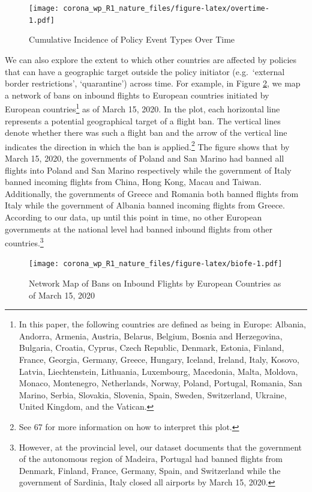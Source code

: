 \documentclass[]{article}
\let\rmarkdownfootnote\footnote%
\def\footnote{\protect\rmarkdownfootnote}
\begin{document}
\begin{figure}
\centering
\texttt{[image: corona\_wp\_R1\_nature\_files/figure-latex/overtime-1.pdf]}
\caption{\label{fig:overtime}Cumulative Incidence of Policy Event Types Over Time}
\end{figure}

We can also explore the extent to which other countries are affected by policies that can have a geographic target outside the policy initiator (e.g.~`external border restrictions', `quarantine') across time. For example, in Figure \ref{fig:biofe}, we map a network of bans on inbound flights to European countries initiated by European countries\footnote{In this paper, the following countries are defined as being in Europe: Albania, Andorra, Armenia, Austria, Belarus, Belgium, Bosnia and Herzegovina, Bulgaria, Croatia, Cyprus, Czech Republic, Denmark, Estonia, Finland, France, Georgia, Germany, Greece, Hungary, Iceland, Ireland, Italy, Kosovo, Latvia, Liechtenstein, Lithuania, Luxembourg, Macedonia, Malta, Moldova, Monaco, Montenegro, Netherlands, Norway, Poland, Portugal, Romania, San Marino, Serbia, Slovakia, Slovenia, Spain, Sweden, Switzerland, Ukraine, United Kingdom, and the Vatican.} as of March 15, 2020. In the plot, each horizontal line represents a potential geographical target of a flight ban. The vertical lines denote whether there was such a flight ban and the arrow of the vertical line indicates the direction in which the ban is applied.\footnote{See 67 for more information on how to interpret this plot.} The figure shows that by March 15, 2020, the governments of Poland and San Marino had banned all flights into Poland and San Marino respectively while the government of Italy banned incoming flights from China, Hong Kong, Macau and Taiwan. Additionally, the governments of Greece and Romania both banned flights from Italy while the government of Albania banned incoming flights from Greece. According to our data, up until this point in time, no other European governments at the national level had banned inbound flights from other countries.\footnote{However, at the provincial level, our dataset documents that the government of the autonomous region of Madeira, Portugal had banned flights from Denmark, Finland, France, Germany, Spain, and Switzerland while the government of Sardinia, Italy closed all airports by March 15, 2020.}

\begin{figure}
\centering
\texttt{[image: corona\_wp\_R1\_nature\_files/figure-latex/biofe-1.pdf]}
\caption{\label{fig:biofe}Network Map of Bans on Inbound Flights by European Countries as of March 15, 2020}
\end{figure}
\end{document}
